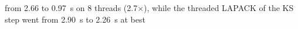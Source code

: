 from 2.66 to 0.97~s on 8 threads (2.7$\times$), while the threaded LAPACK of the KS step went from 2.90~s to 2.26~s at best
